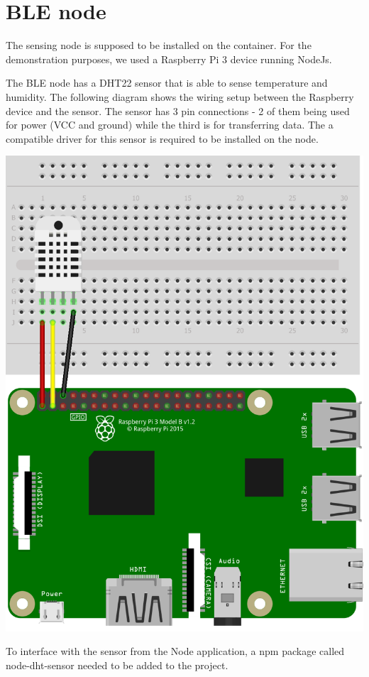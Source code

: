 \section {BLE node}
\label {Impl_BLEnodeSection}

The sensing node is supposed to be installed on the container. For the demonstration purposes, we used a Raspberry Pi 3 device running NodeJs.

The BLE node has a DHT22 sensor that is able to sense temperature and humidity. The following diagram shows the wiring setup between the Raspberry device and the sensor. The sensor has 3 pin connections - 2 of them being used for power (VCC and ground) while the third is for transferring data. The a compatible driver for this sensor is required to be installed on the node.

\bigskip
\includegraphics[scale=0.7]{gfx/RaspberrySensorNode} 
\bigskip

To interface with the sensor from the Node application, a npm package called node-dht-sensor needed to be added to the project.

